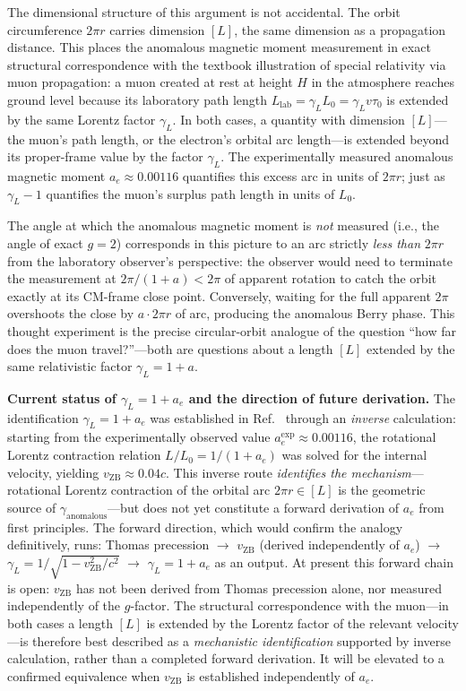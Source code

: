 \documentclass[%
 reprint,
 amsmath,amssymb,
 aps,
 prb,
]{revtex4-2}
\numberwithin{equation}{section}
\theoremstyle{definition}
\theoremstyle{remark}
\begin{document}
The dimensional structure of this argument is not accidental. The orbit circumference $2\pi r$ carries dimension $[L]$, the same dimension as a propagation distance. This places the anomalous magnetic moment measurement in exact structural correspondence with the textbook illustration of special relativity via muon propagation: a muon created at rest at height $H$ in the atmosphere reaches ground level because its laboratory path length $L_{\text{lab}} = \gamma_L L_0 = \gamma_L v\tau_0$ is extended by the same Lorentz factor $\gamma_L$. In both cases, a quantity with dimension $[L]$---the muon's path length, or the electron's orbital arc length---is extended beyond its proper-frame value by the factor $\gamma_L$. The experimentally measured anomalous magnetic moment $a_e \approx 0.00116$ quantifies this excess arc in units of $2\pi r$; just as $\gamma_L - 1$ quantifies the muon's surplus path length in units of $L_0$.

The angle at which the anomalous magnetic moment is \emph{not} measured (i.e., the angle of exact $g = 2$) corresponds in this picture to an arc strictly \emph{less than} $2\pi r$ from the laboratory observer's perspective: the observer would need to terminate the measurement at $2\pi/(1+a) < 2\pi$ of apparent rotation to catch the orbit exactly at its CM-frame close point. Conversely, waiting for the full apparent $2\pi$ overshoots the close by $a \cdot 2\pi r$ of arc, producing the anomalous Berry phase. This thought experiment is the precise circular-orbit analogue of the question ``how far does the muon travel?''---both are questions about a length $[L]$ extended by the same relativistic factor $\gamma_L = 1+a$.

\textbf{Current status of $\gamma_L = 1+a_e$ and the direction of future derivation.} The identification $\gamma_L = 1+a_e$ was established in Ref.~\cite{Hanamura_2026_35} through an \emph{inverse} calculation: starting from the experimentally observed value $a_e^{\text{exp}} \approx 0.00116$, the rotational Lorentz contraction relation $L/L_0 = 1/(1+a_e)$ was solved for the internal velocity, yielding $v_{\text{ZB}} \approx 0.04c$. This inverse route \emph{identifies the mechanism}---rotational Lorentz contraction of the orbital arc $2\pi r \in [L]$ is the geometric source of $\gamma_{\text{anomalous}}$---but does not yet constitute a forward derivation of $a_e$ from first principles. The forward direction, which would confirm the analogy definitively, runs: Thomas precession $\to$ $v_{\text{ZB}}$ (derived independently of $a_e$) $\to$ $\gamma_L = 1/\sqrt{1-v_{\text{ZB}}^2/c^2}$ $\to$ $\gamma_L = 1+a_e$ as an output. At present this forward chain is open: $v_{\text{ZB}}$ has not been derived from Thomas precession alone, nor measured independently of the $g$-factor. The structural correspondence with the muon---in both cases a length $[L]$ is extended by the Lorentz factor of the relevant velocity---is therefore best described as a \emph{mechanistic identification} supported by inverse calculation, rather than a completed forward derivation. It will be elevated to a confirmed equivalence when $v_{\text{ZB}}$ is established independently of $a_e$.
\end{document}
